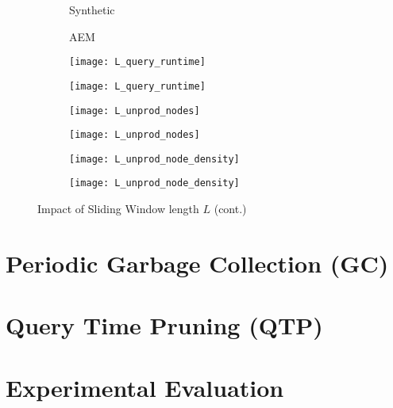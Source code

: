 \documentclass[abstracton,12pt]{scrartcl}
\theoremstyle{definition}
\begin{document}
\begin{figure}[h]\ContinuedFloat
  \centering
  \begin{subfigure}{0.49\linewidth}
    \centering
    Synthetic
  \end{subfigure}
  \begin{subfigure}{0.49\linewidth}
    \centering
    AEM
  \end{subfigure}
  \begin{subfigure}{0.49\linewidth}
    \centering
    \texttt{[image: L\_query\_runtime]}
    \caption{}
    \label{fig:L_query_runtime_synthetic}
  \end{subfigure}
  \begin{subfigure}{0.49\linewidth}
    \centering
    \texttt{[image: L\_query\_runtime]}
    \caption{}
    \label{fig:L_query_runtime_aem}
  \end{subfigure}
  \begin{subfigure}{0.49\linewidth}
    \centering
    \texttt{[image: L\_unprod\_nodes]}
    \caption{}
    \label{fig:L_unprod_nodes_synthetic}
  \end{subfigure}
  \begin{subfigure}{0.49\linewidth}
    \centering
    \texttt{[image: L\_unprod\_nodes]}
    \caption{}
    \label{fig:L_unprod_nodes_aem}
  \end{subfigure}
  \begin{subfigure}{0.49\linewidth}
    \centering
    \texttt{[image: L\_unprod\_node\_density]}
    \caption{}
    \label{fig:L_unprod_node_density_synthetic}
  \end{subfigure}
  \begin{subfigure}{0.49\linewidth}
    \centering
    \texttt{[image: L\_unprod\_node\_density]}
    \caption{}
    \label{fig:L_unprod_node_density_aem}
  \end{subfigure}
  \caption{Impact of Sliding Window length $L$ (cont.)}
  \label{fig:sliding_window_length}
\end{figure}




\section{Periodic Garbage Collection (GC)}

\section{Query Time Pruning (QTP)}

\section{Experimental Evaluation}






\newpage



\end{document}
